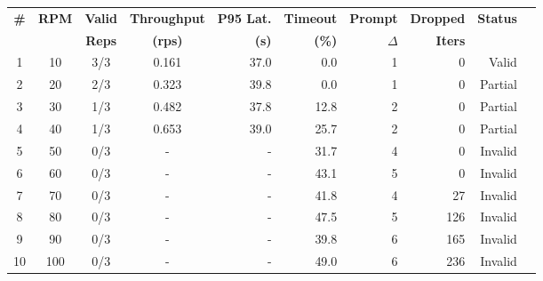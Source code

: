 \begin{tabular}{ccccrrrrrc}
\toprule
\textbf{\#} & \textbf{RPM} & \textbf{Valid} & \textbf{Throughput} & \textbf{P95 Lat.} & \textbf{Timeout} & \textbf{Prompt} & \textbf{Dropped} & \textbf{Status} \\
 & & \textbf{Reps} & \textbf{(rps)} & \textbf{(s)} & \textbf{(\%)} & $\Delta$ & \textbf{Iters} & \\
\midrule
1 & 10 & 3/3 & 0.161 & 37.0 & 0.0 & 1 & 0 & \cellcolor{validgreen}Valid \\
2 & 20 & 2/3 & 0.323 & 39.8 & 0.0 & 1 & 0 & \cellcolor{partialyellow}Partial \\
3 & 30 & 1/3 & 0.482 & 37.8 & 12.8 & 2 & 0 & \cellcolor{partialyellow}Partial \\
4 & 40 & 1/3 & 0.653 & 39.0 & 25.7 & 2 & 0 & \cellcolor{partialyellow}Partial \\
5 & 50 & 0/3 & - & - & 31.7 & 4 & 0 & \cellcolor{invalidred}Invalid \\
6 & 60 & 0/3 & - & - & 43.1 & 5 & 0 & \cellcolor{invalidred}Invalid \\
7 & 70 & 0/3 & - & - & 41.8 & 4 & 27 & \cellcolor{invalidred}Invalid \\
8 & 80 & 0/3 & - & - & 47.5 & 5 & 126 & \cellcolor{invalidred}Invalid \\
9 & 90 & 0/3 & - & - & 39.8 & 6 & 165 & \cellcolor{invalidred}Invalid \\
10 & 100 & 0/3 & - & - & 49.0 & 6 & 236 & \cellcolor{invalidred}Invalid \\
\bottomrule
\end{tabular}